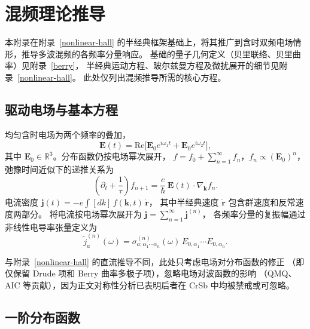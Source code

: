 ﻿%
\chapter{混频理论推导}
\label{MWM}

本附录在附录~\ref{nonlinear-hall} 的半经典框架基础上，将其推广到含时双频电场情形，推导多波混频的各频率分量响应。
基础的量子几何定义（贝里联络、贝里曲率）见附录~\ref{berry}，
半经典运动方程、玻尔兹曼方程及微扰展开的细节见附录~\ref{nonlinear-hall}。
此处仅列出混频推导所需的核心方程。

\section{驱动电场与基本方程}

均匀含时电场为两个频率的叠加，
\begin{equation}
\mathbf{E}(t) = \mathrm{Re}\!\Big[\mathbf{E}_0 e^{i\omega_1 t} + \mathbf{E}_0 e^{i\omega_2 t}\Big],
\label{eq:E_field}
\end{equation}
其中 \(\mathbf{E}_0 \in \mathbb{R}^3\)。分布函数仍按电场幂次展开，
\(f = f_0 + \sum_{n=1}^\infty f_n\)，\(f_n \propto (\mathbf{E}_0)^n\)，
弛豫时间近似下的递推关系为
\begin{equation}
\left(\partial_t + \frac{1}{\tau}\right) f_{n+1} = \frac{e}{\hbar}\,\mathbf{E}(t)\cdot\nabla_\mathbf{k} f_n.
\label{eq:recurrence}
\end{equation}
电流密度 \(\mathbf{j}(t) = -e \int [dk]\, f(\mathbf{k},t)\,\dot{\mathbf{r}}\)，
其中半经典速度 \(\dot{\mathbf{r}}\) 包含群速度和反常速度两部分。
将电流按电场幂次展开为 \(\mathbf{j} = \sum_{n=1}^\infty \mathbf{j}^{(n)}\)，
各频率分量的复振幅通过非线性电导率张量定义为
\begin{equation}
\tilde{j}^{(n)}_a(\omega) = \sigma^{(n)}_{a;\alpha_1\cdots\alpha_n}(\omega)\, E_{0,\alpha_1}\!\cdots E_{0,\alpha_n}.
\label{eq:sigma_def}
\end{equation}

与附录~\ref{nonlinear-hall} 的直流推导不同，此处只考虑电场对分布函数的修正
（即仅保留 Drude 项和 Berry 曲率多极子项），忽略电场对波函数的影响
（QMQ、AIC 等贡献），因为正文对称性分析已表明后者在 CrSb 中均被禁戒或可忽略。
\section{一阶分布函数}

